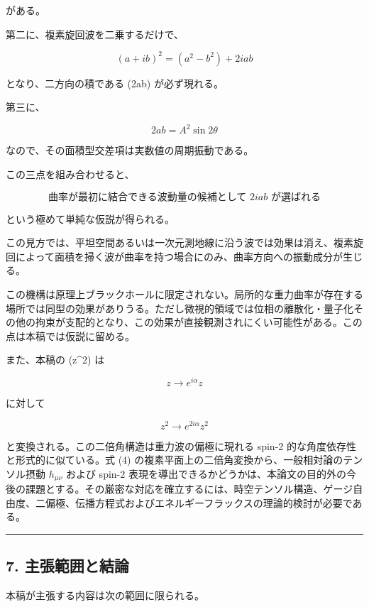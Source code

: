 \documentclass[
  a4paper,
]{ltjsarticle}
\begin{document}
がある。

第二に、複素旋回波を二乗するだけで、

\[(a+ib)^2=(a^2-b^2)+2iab\]

となり、二方向の積である (2ab) が必ず現れる。

第三に、

\[2ab=A^2\sin2\theta\]

なので、その面積型交差項は実数値の周期振動である。

この三点を組み合わせると、

\[\boxed{\text{曲率が最初に結合できる波動量の候補として }2iab\text{ が選ばれる}}\]

という極めて単純な仮説が得られる。

この見方では、平坦空間あるいは一次元測地線に沿う波では効果は消え、複素旋回によって面積を掃く波が曲率を持つ場合にのみ、曲率方向への振動成分が生じる。

この機構は原理上ブラックホールに限定されない。局所的な重力曲率が存在する場所では同型の効果がありうる。ただし微視的領域では位相の離散化・量子化その他の拘束が支配的となり、この効果が直接観測されにくい可能性がある。この点は本稿では仮説に留める。

また、本稿の (z\^{}2) は

\[z\rightarrow e^{i\alpha}z\]

に対して

\[z^2\rightarrow e^{2i\alpha}z^2\]

と変換される。この二倍角構造は重力波の偏極に現れる spin-2
的な角度依存性と形式的に似ている。式 (4)
の複素平面上の二倍角変換から、一般相対論のテンソル摂動 \(h_{\mu\nu}\)
および spin-2
表現を導出できるかどうかは、本論文の目的外の今後の課題とする。その厳密な対応を確立するには、時空テンソル構造、ゲージ自由度、二偏極、伝播方程式およびエネルギーフラックスの理論的検討が必要である。

\begin{center}\rule{0.5\linewidth}{0.5pt}\end{center}

\subsection{7.
主張範囲と結論}\label{ux4e3bux5f35ux7bc4ux56f2ux3068ux7d50ux8ad6}

本稿が主張する内容は次の範囲に限られる。
\end{document}
